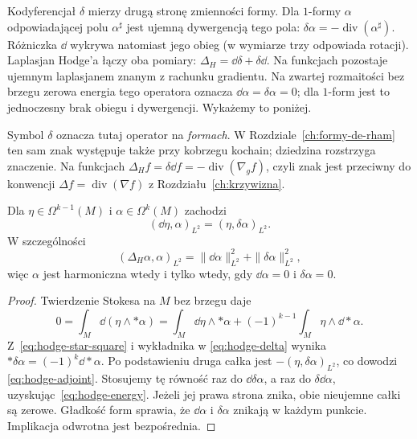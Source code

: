 Kodyferencjał $\delta$ mierzy drugą stronę zmienności
formy. Dla $1$-formy $\alpha$ odpowiadającej polu
$\alpha^\sharp$ jest ujemną dywergencją tego pola:
$\delta\alpha=-\operatorname{div}(\alpha^\sharp)$.
Różniczka $\dd$ wykrywa natomiast jego obieg
(w wymiarze trzy odpowiada rotacji). Laplasjan Hodge'a
łączy oba pomiary: $\Delta_H=\dd\delta+\delta\dd$.
Na funkcjach pozostaje ujemnym laplasjanem znanym z
rachunku gradientu. Na zwartej rozmaitości bez brzegu
zerowa energia tego operatora oznacza
$\dd\alpha=\delta\alpha=0$; dla $1$-form jest to
jednoczesny brak obiegu i dywergencji.
Wykażemy to poniżej.

Symbol $\delta$ oznacza tutaj operator na \emph{formach}.
W Rozdziale~\ref{ch:formy-de-rham} ten sam znak występuje
także przy kobrzegu kochain; dziedzina rozstrzyga znaczenie.
Na funkcjach $\Delta_H f=\delta\dd f=-\operatorname{div}
(\nabla_g f)$, czyli znak jest przeciwny do konwencji
$\Delta f=\operatorname{div}(\nabla f)$ z
Rozdziału~\ref{ch:krzywizna}.

\begin{stwierdzenie}
\label{prop:hodge-adjoint-energy}
Dla $\eta\in\Omega^{k-1}(M)$ i $\alpha\in\Omega^k(M)$
zachodzi
\begin{equation}\label{eq:hodge-adjoint}
 (\dd\eta,\alpha)_{L^2}=(\eta,\delta\alpha)_{L^2}.
\end{equation}
W szczególności
\begin{equation}\label{eq:hodge-energy}
 (\Delta_H\alpha,\alpha)_{L^2}
 =\|\dd\alpha\|_{L^2}^2+\|\delta\alpha\|_{L^2}^2,
\end{equation}
więc $\alpha$ jest harmoniczna wtedy i tylko wtedy, gdy
$\dd\alpha=0$ i $\delta\alpha=0$.
\end{stwierdzenie}
\begin{proof}
Twierdzenie Stokesa na $M$ bez brzegu daje
\[
 0=\int_M\dd(\eta\wedge*\alpha)
  =\int_M\dd\eta\wedge*\alpha
   +(-1)^{k-1}\int_M\eta\wedge\dd*\alpha.
\]
Z~\eqref{eq:hodge-star-square} i wykładnika w
\eqref{eq:hodge-delta} wynika
$*\delta\alpha=(-1)^k\dd*\alpha$.
Po podstawieniu druga całka jest
$-(\eta,\delta\alpha)_{L^2}$, co dowodzi
\eqref{eq:hodge-adjoint}. Stosujemy tę równość raz do
$\dd\delta\alpha$, a raz do $\delta\dd\alpha$,
uzyskując~\eqref{eq:hodge-energy}.
Jeżeli jej prawa strona znika, obie nieujemne całki są
zerowe. Gładkość form sprawia, że $\dd\alpha$ i
$\delta\alpha$ znikają w każdym punkcie. Implikacja
odwrotna jest bezpośrednia.
\end{proof}

